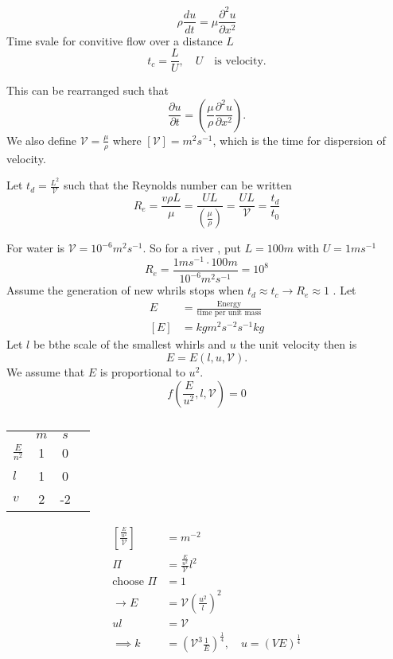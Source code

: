 \documentclass{article}
\theoremstyle{remark}
\newcommand{\newpara}
  {
  \vskip 0.4cm
  }
\begin{document}
\[
\rho \frac{d u}{d t}  = \mu \frac{\partial ^2 u}{\partial x^2} 
\] 
Time svale for convitive flow over a distance $L$ \[
t_{c} = \frac{L}{U}  , \quad  U \quad  \text{is velocity.}  
\] 

This can be rearranged such that \[
\frac{\partial u}{\partial t}  = \left( \frac{\mu }{\rho } \frac{\partial ^2 u}{\partial x ^2}  \right). 
\] 
We also define $\mathcal{V}  = \frac{\mu }{\rho }  $ where $\left[ \mathcal{V}  \right] = m^2 s^{-1}$, which is the time for dispersion of velocity. 

\newpara
Let $t_{d} = \frac{L^2}{\mathcal{V} }$ such that the Reynolds number can be written \[
  R_{e} = \frac{v \rho  L}{\mu }  = \frac{UL}{\left( \frac{\mu }{\rho }  \right) }  = \frac{UL}{\mathcal{V} }   =   \frac{ t_{d}}{ t _{0}} 
\] 


\newpara
For water is $\mathcal{V}  = 10^{-6} m^2 s^{-1}$. So for a river , put $L = 100m$ with $U = 1 m s^{-1}$ \[
R_{e} = \frac{1 m s^{-1} \cdot  100m}{ 10 ^{-6} m ^2 s^{-1 }}  = 10 ^{8}
\] 
Assume the generation of new whrils stops when $ t_{d} \approx t_{c} \to  R_{e} \approx 1$ . Let \[
\begin{split}
  E  &=  \frac{\text{Energy}}{ \text{time per unit mass}}  \\
  \left[ E \right] &=  kg m^2 s^{-2} s^{-1} kg
\end{split} 
\] 
Let $l$ be bthe scale of the smallest whirls and $u$ the unit velocity then is \[
E = E\left( l,u , \mathcal{V}  \right). 
\] 
We assume that $E$ is proportional to $u^2$. \[
f\left( \frac{E}{u^2} , l , \mathcal{V}  \right) = 0
\] 

\begin{table}[htpb]
  \centering
  \caption{}
  \label{tab:jsjksja}
  \begin{tabular}{l|ccc}
    & $m$   & $s$ &  \\
   $\frac{E}{n^2}$ &  1 & 0  &  \\
   $l$ & 1 & 0 \\
   $v$ & 2 & -2
  \end{tabular}
\end{table}
   
\[
  \begin{split}
    \left[ \frac{\frac{E}{u^2}}{\mathcal{V} }  \right] &= m^{-2} \\
    \Pi  &= \frac{\frac{E}{u^2}}{\mathcal{V} } l^2 \\
    \text{choose } \Pi &= 1 \\
    \to E &=  \mathcal{V}  (\frac{u^2}{l})^2  \\
    ul &= \mathcal{V}  \\
    \implies  k &= \left( \mathcal{V}^{3} \frac{1}{E}   \right)^{\frac{1}{4} }, \quad  u = \left( V E \right)^{\frac{1}{4}}  \\
  \end{split} 
\] 
\end{document}
